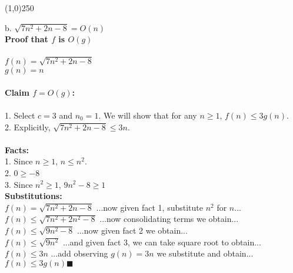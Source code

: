 \documentclass[OPONE]{example}
\begin{document}
\begin{list}{}{}
\newpage

	\begin{center}
	\line(1,0){250}
\end{center}

	\item{b.}  
	$\sqrt{7n^{2} + 2n - 8} = O(n)$ \\
	
\textbf{Proof that $f$ is $O(g)$} \\ 
	\\
	$f(n) = \sqrt{7n^{2} + 2n - 8} $ \\
	$g(n) = n$ \\
	\\
	
\textbf{Claim $f = O(g)$: }\\
	\\
	1. Select $c = 3$ and $n_{0} = 1$.  We will show that for any $n \geq 1$, $f(n) \leq 3g(n)$. \\
	2. Explicitly, $\sqrt{7n^{2} + 2n - 8} \leq 3n$.\\
	\\
\textbf{Facts:} \\
	1. Since $n \geq 1$, $n \leq n^{2}$.\\
	2. $0 \geq -8$ \\
	3. Since $n^{2} \geq 1$, $9n^{2} - 8 \geq 1$ \\
	
\textbf{Substitutions:} \\
	$f(n) = \sqrt{7n^{2} + 2n - 8} $ \hspace{1.06 in} ...now given fact 1, substitute $n^{2}$ for $n$... \\
	$f(n)  \leq \sqrt{7n^{2} + 2n^{2} - 8} $  \hspace{1 in} ...now consolidating terms we obtain...\\
	$f(n) \leq \sqrt{9n^{2} - 8}$\hspace{1.42 in} ...now given fact 2 we obtain...\\
	$f(n) \leq \sqrt{9n^{2}}$ \hspace{1.62 in} ...and given fact 3, we can take square root to obtain... \\
	$f(n) \leq 3n$  \hspace{1.80 in} ...add observing $g(n) = 3n$ we substitute and obtain... \\
	$f(n) \leq 3g(n)  \blacksquare$ \\
	\\
	
\newpage
	

\end{list}
\end{document}
